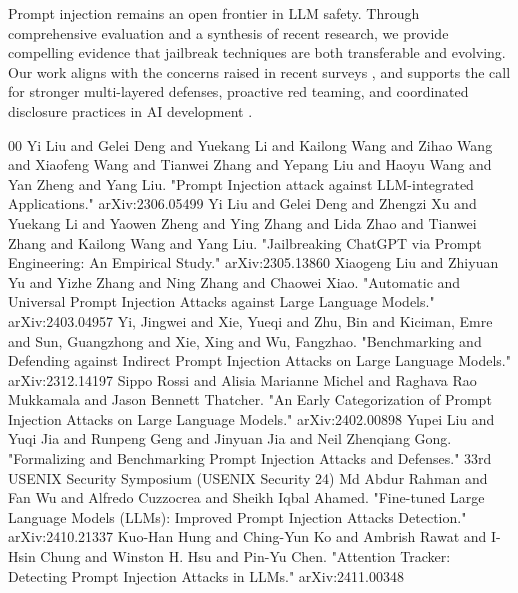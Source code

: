\documentclass[conference]{IEEEtran}
\begin{document}
Prompt injection remains an open frontier in LLM safety. Through comprehensive evaluation and a synthesis of recent research, we provide compelling evidence that jailbreak techniques are both transferable and evolving. Our work aligns with the concerns raised in recent surveys \cite{liu2024promptinjection1}\cite{liu2024jailbreaking2}\cite{lin2025uniguardianunified13}\cite{zhu2024promptrobust31}, and supports the call for stronger multi-layered defenses, proactive red teaming, and coordinated disclosure practices in AI development \cite{wang2025manipulating19}\cite{olaiman2019releasestrategies23}\cite{brundage2020trustworthy24}.



\begin{thebibliography}{00}
 Yi Liu and Gelei Deng and Yuekang Li and Kailong Wang and Zihao Wang and Xiaofeng Wang and Tianwei Zhang and Yepang Liu and Haoyu Wang and Yan Zheng and Yang Liu. "Prompt Injection attack against LLM-integrated Applications." arXiv:2306.05499
 Yi Liu and Gelei Deng and Zhengzi Xu and Yuekang Li and Yaowen Zheng and Ying Zhang and Lida Zhao and Tianwei Zhang and Kailong Wang and Yang Liu. "Jailbreaking ChatGPT via Prompt Engineering: An Empirical Study." arXiv:2305.13860
 Xiaogeng Liu and Zhiyuan Yu and Yizhe Zhang and Ning Zhang and Chaowei Xiao. "Automatic and Universal Prompt Injection Attacks against Large Language Models." 	arXiv:2403.04957
 Yi, Jingwei and Xie, Yueqi and Zhu, Bin and Kiciman, Emre and Sun, Guangzhong and Xie, Xing and Wu, Fangzhao. "Benchmarking and Defending against Indirect Prompt Injection Attacks on Large Language Models." arXiv:2312.14197
 Sippo Rossi and Alisia Marianne Michel and Raghava Rao Mukkamala and Jason Bennett Thatcher. "An Early Categorization of Prompt Injection Attacks on Large Language Models." arXiv:2402.00898
 Yupei Liu and Yuqi Jia and Runpeng Geng and Jinyuan Jia and Neil Zhenqiang Gong. "Formalizing and Benchmarking Prompt Injection Attacks and Defenses." 33rd USENIX Security Symposium (USENIX Security 24)
 Md Abdur Rahman and Fan Wu and Alfredo Cuzzocrea and Sheikh Iqbal Ahamed. "Fine-tuned Large Language Models (LLMs): Improved Prompt Injection Attacks Detection." arXiv:2410.21337
 Kuo-Han Hung and Ching-Yun Ko and Ambrish Rawat and I-Hsin Chung and Winston H. Hsu and Pin-Yu Chen. "Attention Tracker: Detecting Prompt Injection Attacks in LLMs." arXiv:2411.00348

\end{thebibliography}
\end{document}

